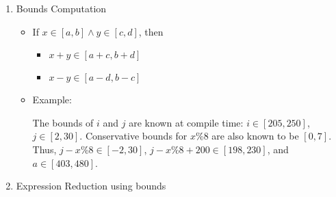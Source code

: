 \begin{enumerate}
\def\labelenumi{\arabic{enumi}.}
\tightlist
\item
  Bounds Computation

  \begin{itemize}
  \item
    If \(x \in [a, b] \wedge y \in [c, d]\), then

    \begin{itemize}
    \tightlist
    \item
      \(x + y \in [a + c, b + d]\)
    \item
      \(x - y \in [a - d, b - c]\)
    \end{itemize}
  \item
    Example:

\begin{Shaded}
\begin{Highlighting}[]
   \OperatorTok{(}\OperatorTok{=} \OperatorTok{;}\OperatorTok{\textless{}=} \OperatorTok{;}\OperatorTok{+=} \OperatorTok{)} \OperatorTok{\{}
     \OperatorTok{(}\OperatorTok{=} \OperatorTok{;}\OperatorTok{\textless{}=} \OperatorTok{;}\OperatorTok{+=} \OperatorTok{)} \OperatorTok{\{}
\OperatorTok{=}\OperatorTok{();}
\OperatorTok{=} \OperatorTok{(}\OperatorTok{{-}}\OperatorTok{\%}  \OperatorTok{+} \OperatorTok{)} \OperatorTok{+}\OperatorTok{;}
\OperatorTok{=}\OperatorTok{/} \OperatorTok{;}
\OperatorTok{=}\OperatorTok{\%} \OperatorTok{;}
    \OperatorTok{\}}
  \OperatorTok{\}}
\end{Highlighting}
\end{Shaded}

    The bounds of \(i\) and \(j\) are known at compile time:
    \(i \in [205, 250]\), \(j \in [2, 30]\). Conservative bounds for
    \(x \% 8\) are also known to be \([0, 7]\). Thus,
    \(j - x \% 8 \in [-2, 30]\), \(j - x \% 8 + 200 \in [198, 230]\),
    and \(a \in [403, 480]\).
  \end{itemize}
\item
  Expression Reduction using bounds


\end{enumerate}

